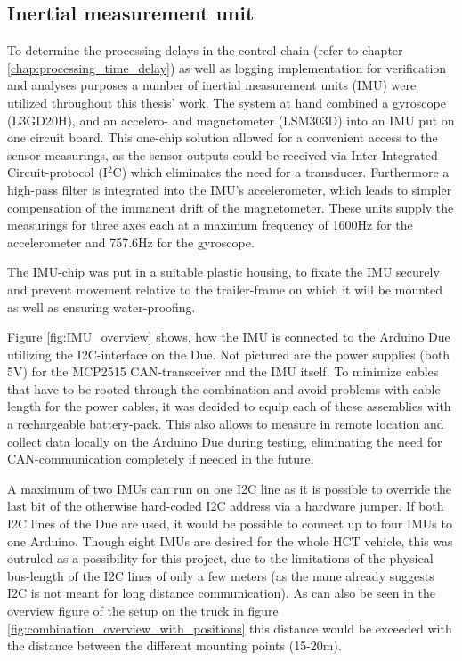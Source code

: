 \documentclass[ExampleMasters.tex]{subfiles}
\begin{document}
\subsection{Inertial measurement unit}
\label{sec:IMU}
To determine the processing delays in the control chain (refer to chapter \ref{chap:processing_time_delay}) as well as logging implementation for verification and analyses purposes a number of inertial measurement units (IMU) were utilized throughout this thesis' work. The system at hand combined a gyroscope (L3GD20H), and an accelero- and magnetometer (LSM303D) into an \gls{IMU} put on one circuit board.\cite{IMU_homepage_shop} This one-chip solution allowed for a convenient access to the sensor measurings, as the sensor outputs could be received via Inter-Integrated Circuit-protocol (I$^{2}$C)  which eliminates the need for a transducer. Furthermore a high-pass filter is integrated into the \gls{IMU}'s accelerometer, which leads to simpler compensation of the immanent drift of the magnetometer. These units supply the measurings for three axes each at a maximum frequency of 1600Hz for the accelerometer and 757.6Hz for the gyroscope.\cite{accelerometer_datasheet}\cite{gyrometer_datasheet}

The \gls{IMU}-chip was put in a suitable plastic housing, to fixate the \gls{IMU} securely and prevent movement relative to the trailer-frame on which it will be mounted as well as ensuring water-proofing.

Figure \ref{fig:IMU_overview} shows, how the \gls{IMU} is connected to the Arduino Due utilizing the \gls{I2C}-interface on the Due. Not pictured are the power supplies (both 5V) for the MCP2515 \gls{CAN}-transceiver and the \gls{IMU} itself. To minimize cables that have to be rooted through the combination and avoid problems with cable length for the power cables, it was decided to equip each of these assemblies with a rechargeable battery-pack. This also allows to measure in remote location and collect data locally on the Arduino Due during testing, eliminating the need for \gls{CAN}-communication completely if needed in the future.

A maximum of two \gls{IMU}s can run on one \gls{I2C} line as it is possible to override the last bit of the otherwise hard-coded \gls{I2C} address via a hardware jumper. If both \gls{I2C} lines of the Due are used, it would be possible to connect up to four IMUs to one Arduino. Though eight \gls{IMU}s are desired for the whole \gls{HCT} vehicle, this was outruled as a possibility for this project, due to the limitations of the physical bus-length of the \gls{I2C} lines of only a few meters (as the name already suggests \gls{I2C} is not meant for long distance communication). As can also be seen in the overview figure of the setup on the truck in figure \ref{fig:combination_overview_with_positions} this distance would be exceeded with the distance between the different mounting points (15-20m).
\end{document}
